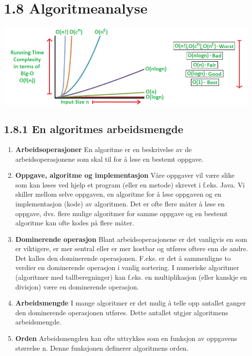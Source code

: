 \documentclass[11pt]{article}
\begin{document}
\section{1.8 Algoritmeanalyse}

    \includegraphics[center]{big_o.png}

\newpage

    \subsection{1.8.1 En algoritmes arbeidsmengde}
        \begin{enumerate}
            \item \textbf{Arbeidsoperasjoner} En algoritme er en beskrivelse av de arbeidsoperasjonene som skal
                til for å løse en bestemt oppgave.
            \item \textbf{Oppgave, algoritme og implementasjon} Våre oppgaver vil være slike som kan løses
                ved hjelp et program (eller en metode) skrevet i f.eks. Java. Vi skiller mellom selve
                oppgaven, en algoritme for å løse oppgaven og en implementasjon (kode) av algoritmen.
                Det er ofte flere måter å løse en oppgave, dvs. flere mulige algoritmer for samme oppgave
                og en bestemt algoritme kan ofte kodes på flere måter.
            \item \textbf{Dominerende operasjon}  Blant arbeidsoperasjonene er det vanligvis en som er viktigere,
                er mer sentral eller er mer kostbar og utføres oftere enn de andre. Det kalles den
                dominerende operasjonen. F.eks. er det å sammenligne to verdier en dominerende
                operasjon i vanlig sortering. I numeriske algoritmer (algoritmer med tallberegninger) kan
                f.eks. en multiplikasjon (eller kanskje en divisjon) være en dominerende operasjon.
            \item \textbf{Arbeidsmengde} I mange algoritmer er det mulig å telle opp antallet ganger den
                dominerende operasjonen utføres. Dette antallet utgjør algoritmens arbeidsmengde.
            \item \textbf{Orden} Arbeidsmengden kan ofte uttrykkes som en funksjon av oppgavens størrelse n.
                Denne funksjonen definerer algoritmens orden.
        \end{enumerate}
\end{document}
